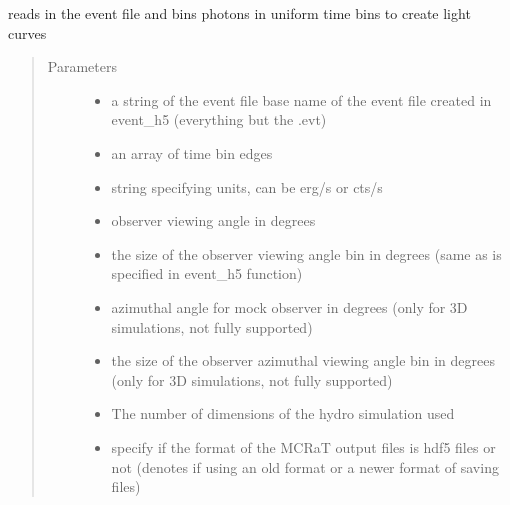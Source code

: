 \documentclass[letterpaper,10pt,english]{sphinxmanual}
\begin{document}
\begin{fulllineitems}
\label{\detokenize{mclib:mclib.lcur_old}}
reads in the event file and bins photons in uniform time bins to create light curves
\begin{quote}\begin{description}
\item[{Parameters}] \leavevmode\begin{itemize}
\item {} 
 \textendash{} a string of the event file base name of the event file created in event\_h5 (everything but the .evt)

\item {} 
 \textendash{} an array of time bin edges

\item {} 
 \textendash{} string specifying units, can be erg/s or cts/s

\item {} 
 \textendash{} observer viewing angle in degrees

\item {} 
 \textendash{} the size of the observer viewing angle bin in degrees (same as is specified in event\_h5 function)

\item {} 
 \textendash{} azimuthal angle for mock observer in degrees (only for 3D simulations, not fully supported)

\item {} 
 \textendash{} the size of the observer azimuthal viewing angle bin in degrees (only for 3D simulations, not fully
supported)

\item {} 
 \textendash{} The number of dimensions of the hydro simulation used

\item {} 
 \textendash{} specify if the format of the MCRaT output files is hdf5 files or not (denotes if using an old format or
a newer format of saving files)


\end{itemize}
\end{description}
\end{quote}
\end{fulllineitems}
\end{document}
